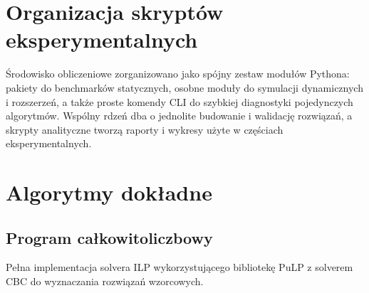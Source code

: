 \section{Organizacja skryptów eksperymentalnych}
Środowisko obliczeniowe zorganizowano jako spójny zestaw modułów
Pythona: pakiety do benchmarków statycznych, osobne moduły do
symulacji dynamicznych i rozszerzeń, a także proste komendy CLI do
szybkiej diagnostyki pojedynczych algorytmów. Wspólny rdzeń dba o
jednolite budowanie i walidację rozwiązań, a skrypty analityczne
tworzą raporty i wykresy użyte w częściach eksperymentalnych.

\section{Algorytmy dokładne}
\subsection{Program całkowitoliczbowy}
Pełna implementacja solvera ILP wykorzystującego bibliotekę PuLP
z solverem CBC do wyznaczania rozwiązań wzorcowych.

